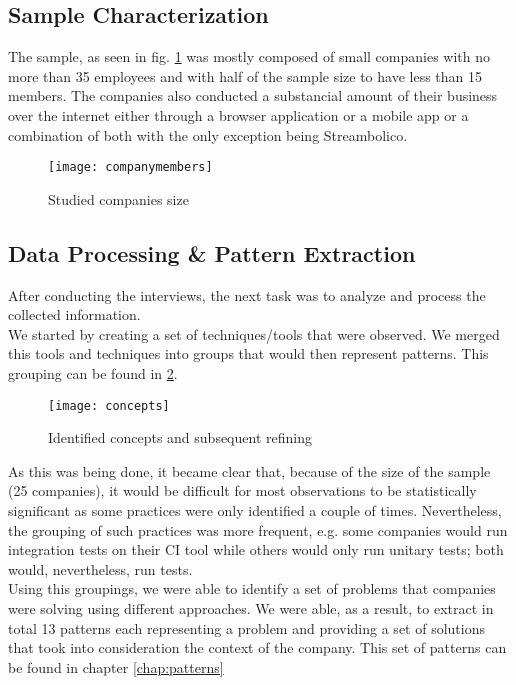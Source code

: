       \subsection{Sample Characterization}
      The sample, as seen in fig. \ref{fig:companymembers} was mostly composed of small companies with no more than 35 employees and with half of the sample size to have less than 15 members. The companies also conducted a substancial amount of their business over the internet either through a browser application or a mobile app or a combination of both with the only exception being Streambolico.
      \begin{figure}
        \texttt{[image: companymembers]}
        \caption{Studied companies size}
        \label{fig:companymembers}
      \end{figure}
      \subsection{Data Processing \& Pattern Extraction}
      After conducting the interviews, the next task was to analyze and process the collected information.\\
      We started by creating a set of techniques/tools that were observed. We merged this tools and techniques into groups that would then represent patterns. This grouping can be found in \ref{fig:concepts}.\\
      \begin{figure}
        \texttt{[image: concepts]}
        \caption{Identified concepts and subsequent refining}
        \label{fig:concepts}
      \end{figure}
      As this was being done, it became clear that, because of the size of the sample (25 companies), it would be difficult for most observations to be statistically significant as some practices were only identified a couple of times. Nevertheless, the grouping of such practices was more frequent, e.g. some companies would run integration tests on their CI tool while others would only run unitary tests; both would, nevertheless, run tests. \\
      Using this groupings, we were able to identify a set of problems that companies were solving using different approaches. We were able, as a result, to extract in total 13 patterns each representing a problem and providing a set of solutions that took into consideration the context of the company.
      This set of patterns can be found in chapter \ref{chap:patterns}
